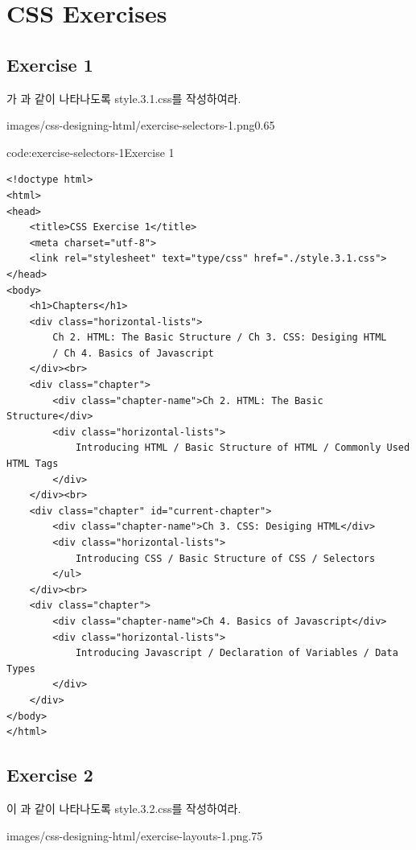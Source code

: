 \section{CSS Exercises} \label{sect:css-exercises}

\subsection*{Exercise 1}
가 과 같이 나타나도록 style.3.1.css를 작성하여라.

    {images/css-designing-html/exercise-selectors-1.png}{0.65}


\begin{codeenv}{code:exercise-selectors-1}{Exercise 1}\begin{verbatim}
<!doctype html>
<html>
<head>
    <title>CSS Exercise 1</title>
    <meta charset="utf-8">
    <link rel="stylesheet" text="type/css" href="./style.3.1.css">
</head>
<body>
    <h1>Chapters</h1>
    <div class="horizontal-lists">
        Ch 2. HTML: The Basic Structure / Ch 3. CSS: Desiging HTML
        / Ch 4. Basics of Javascript
    </div><br>
    <div class="chapter">
        <div class="chapter-name">Ch 2. HTML: The Basic Structure</div>
        <div class="horizontal-lists">
            Introducing HTML / Basic Structure of HTML / Commonly Used HTML Tags
        </div>
    </div><br>
    <div class="chapter" id="current-chapter">
        <div class="chapter-name">Ch 3. CSS: Desiging HTML</div>
        <div class="horizontal-lists">
            Introducing CSS / Basic Structure of CSS / Selectors
        </ul>
    </div><br>
    <div class="chapter">
        <div class="chapter-name">Ch 4. Basics of Javascript</div>
        <div class="horizontal-lists">
            Introducing Javascript / Declaration of Variables / Data Types
        </div>
    </div>
</body>
</html>
\end{verbatim}
\end{codeenv}

\subsection*{Exercise 2}

이 과 같이 나타나도록 style.3.2.css를 작성하여라.

    {images/css-designing-html/exercise-layouts-1.png}{.75}

